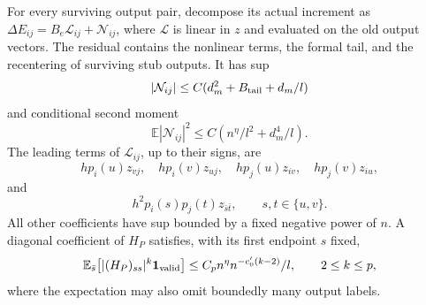 \begin{lemma}\label{lem:early-linearization}
For every surviving output pair, decompose its actual increment as
\(\Delta E_{ij}=B_e\mathcal L_{ij}+\mathcal N_{ij}\), where
\(\mathcal L\) is linear in \(z\) and evaluated on the old output
vectors. The residual contains the nonlinear terms, the formal tail,
and the recentering of surviving stub outputs. It has sup
\[
 |\mathcal N_{ij}|\le C(d_m^2+B_{\rm tail}+d_m/l)
\]
and conditional second moment
\begin{equation}
 \mathbb E|\mathcal N_{ij}|^2
 \le C(n^\eta/l^2+d_m^4/l).
\label{eq:original-29}
\end{equation}
The leading terms of \(\mathcal L_{ij}\), up to their signs, are
\begin{equation}
 h p_i(u)z_{vj},\quad h p_i(v)z_{uj},\quad
 h p_j(u)z_{iv},\quad h p_j(v)z_{iu},
\label{eq:original-30}
\end{equation}
and
\begin{equation}
 h^2p_i(s)p_j(t)z_{\bar s\bar t},
 \qquad s,t\in\{u,v\}.
\label{eq:original-31}
\end{equation}
All other coefficients have sup bounded by a fixed negative power
of \(n\). A diagonal coefficient of \(H_P\) satisfies, with its
first endpoint \(s\) fixed,
\begin{equation}
 \mathbb E_{\bar s}\bigl[|(H_P)_{ss}|^k
                  \mathbf 1_{\rm valid}\bigr]
 \le C_p n^\eta n^{-c'_0(k-2)}/l,
 \qquad 2\le k\le p,
\label{eq:original-32}
\end{equation}
where the expectation may also omit boundedly many output labels.
\end{lemma}
